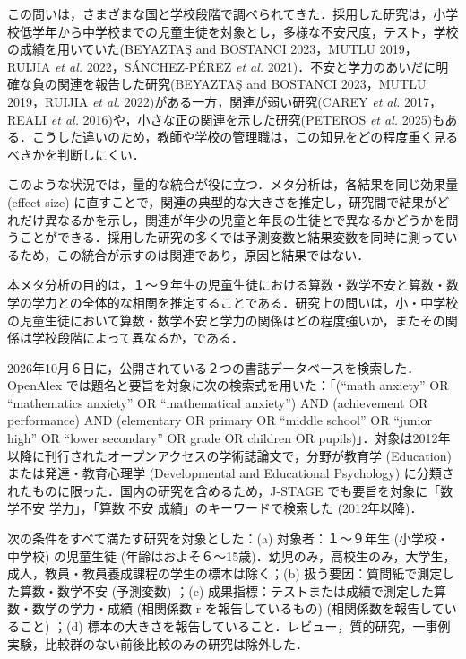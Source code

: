 \documentclass[
  lualatex, ja=standard, paper={182mm,257mm}, twocolumn, fontsize=8.5pt, baselineskip=13.5pt,
  line_length=24zw, column_gap=6.1mm, number_of_lines=45, head_space=24.5mm, gutter=16.25mm
]{jlreq}
\newcommand{\chap}[2]{\par\vspace{13.5pt}\needspace{4\baselineskip}{\centering\gtfamily\bfseries #1．#2\par}\nopagebreak}
\newcommand{\secn}[3]{\par\needspace{3\baselineskip}{\noindent\gtfamily\bfseries #1.#2.\hspace{1\zw}#3\par}\nopagebreak}
\begin{document}
この問いは，さまざまな国と学校段階で調べられてきた．採用した研究は，小学校低学年から中学校までの児童生徒を対象とし，多様な不安尺度，テスト，学校の成績を用いていた(BEYAZTAŞ and BOSTANCI 2023，MUTLU 2019，RUIJIA \textit{et al.} 2022，SÁNCHEZ-PÉREZ \textit{et al.} 2021)．不安と学力のあいだに明確な負の関連を報告した研究(BEYAZTAŞ and BOSTANCI 2023，MUTLU 2019，RUIJIA \textit{et al.} 2022)がある一方，関連が弱い研究(CAREY \textit{et al.} 2017，REALI \textit{et al.} 2016)や，小さな正の関連を示した研究(PETEROS \textit{et al.} 2025)もある．こうした違いのため，教師や学校の管理職は，この知見をどの程度重く見るべきかを判断しにくい．

このような状況では，量的な統合が役に立つ．メタ分析は，各結果を同じ効果量 (effect size) に直すことで，関連の典型的な大きさを推定し，研究間で結果がどれだけ異なるかを示し，関連が年少の児童と年長の生徒とで異なるかどうかを問うことができる．採用した研究の多くでは予測変数と結果変数を同時に測っているため，この統合が示すのは関連であり，原因と結果ではない．

本メタ分析の目的は，１〜９年生の児童生徒における算数・数学不安と算数・数学の学力との全体的な相関を推定することである．研究上の問いは，小・中学校の児童生徒において算数・数学不安と学力の関係はどの程度強いか，またその関係は学校段階によって異なるか，である．

\chap{2}{方法}
\secn{2}{1}{文献の検索}
2026年10月６日に，公開されている２つの書誌データベースを検索した．OpenAlex では題名と要旨を対象に次の検索式を用いた：「(“math anxiety” OR “mathematics anxiety” OR “mathematical anxiety”) AND (achievement OR performance) AND (elementary OR primary OR “middle school” OR “junior high” OR “lower secondary” OR grade OR children OR pupils)」．対象は2012年以降に刊行されたオープンアクセスの学術誌論文で，分野が教育学 (Education) または発達・教育心理学 (Developmental and Educational Psychology) に分類されたものに限った．国内の研究を含めるため，J-STAGE でも要旨を対象に「数学不安 学力」，「算数 不安 成績」のキーワードで検索した (2012年以降)．

\secn{2}{2}{適格基準}
次の条件をすべて満たす研究を対象とした：(a) 対象者：１〜９年生 (小学校・中学校) の児童生徒 (年齢はおよそ６〜15歳)．幼児のみ，高校生のみ，大学生，成人，教員・教員養成課程の学生の標本は除く；(b) 扱う要因：質問紙で測定した算数・数学不安 (予測変数) ；(c) 成果指標：テストまたは成績で測定した算数・数学の学力・成績 (相関係数 r を報告しているもの)  (相関係数を報告していること) ；(d) 標本の大きさを報告していること．レビュー，質的研究，一事例実験，比較群のない前後比較のみの研究は除外した．
\end{document}
